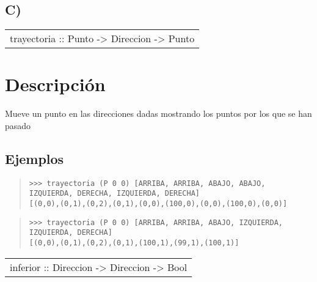 \subsection{C)}
\begin{haddockdesc}
\item[\begin{tabular}{@{}l}
trayectoria :: Punto -> {\char 91}Direccion{\char 93} -> {\char 91}Punto{\char 93}
\end{tabular}]
{\haddockbegindoc
\section*{Descripción}
Mueve un punto en las direcciones dadas mostrando los puntos por los que se han pasado\par
\subsection*{Ejemplos}
\begin{quote}
{\haddockverb\begin{verbatim}
>>> trayectoria (P 0 0) [ARRIBA, ARRIBA, ABAJO, ABAJO, IZQUIERDA, DERECHA, IZQUIERDA, DERECHA]
[(0,0),(0,1),(0,2),(0,1),(0,0),(100,0),(0,0),(100,0),(0,0)]

\end{verbatim}}
\end{quote}
\begin{quote}
{\haddockverb\begin{verbatim}
>>> trayectoria (P 0 0) [ARRIBA, ARRIBA, ABAJO, IZQUIERDA, IZQUIERDA, DERECHA]
[(0,0),(0,1),(0,2),(0,1),(100,1),(99,1),(100,1)]

\end{verbatim}}
\end{quote}}
\end{haddockdesc}
\begin{haddockdesc}
\item[\begin{tabular}{@{}l}
inferior :: {\char 91}Direccion{\char 93} -> {\char 91}Direccion{\char 93} -> Bool
\end{tabular}]
\end{haddockdesc}
